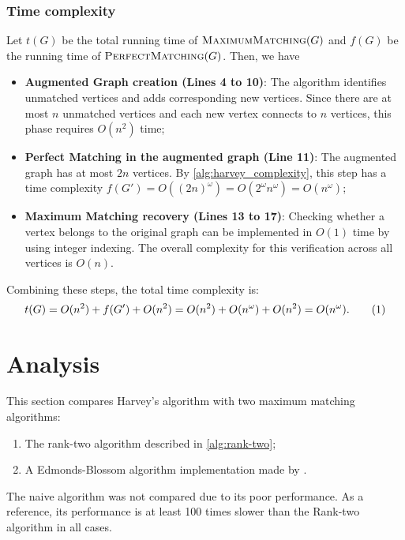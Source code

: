 \subsubsection{Time complexity}
\noindent
Let \(t(G)\) be the total running time of \(\textsc{MaximumMatching}(G)\) and \(f(G)\) be the running time of \(\textsc{PerfectMatching}(G)\). Then, we have
\begin{itemize}
\item \textbf{Augmented Graph creation (Lines 4 to 10)}:
The algorithm identifies unmatched vertices and adds corresponding new vertices. 
Since there are at most \(n\) unmatched vertices and each new vertex connects to \(n\) vertices, this phase requires \(O(n^2)\) time;

\item \textbf{Perfect Matching in the augmented graph (Line 11)}: 
The augmented graph has at most \(2n\) vertices. 
By \cref{alg:harvey_complexity}, this step has a time complexity  \(f(G') = O((2n)^\omega) = O(2^\omega n^\omega) = O(n^\omega)\);

\item \textbf{Maximum Matching recovery (Lines 13 to 17)}: 
Checking whether a vertex belongs to the original graph can be implemented in \(O(1)\) time by using integer indexing. 
The overall complexity for this verification across all vertices is \(O(n)\).
\end{itemize}
Combining these steps, the total time complexity is:
\[
t(G) = O(n^2) + f(G') + O(n^2) = O(n^2) + O(n^\omega) + O(n^2) = O(n^\omega). \numberthis \label{alg:maximum_matching_complexity}
\]

\section{Analysis}
\label{Maximum:analysis}
\noindent
This section compares Harvey's algorithm with two maximum matching algorithms:
\begin{enumerate}
   \item The rank-two algorithm described in \cref{alg:rank-two};
   \item A Edmonds-Blossom algorithm implementation made by \citet{giovana:blossom}.
\end{enumerate}
\noindent
The naive algorithm was not compared due to its poor performance.
As a reference, its performance is at least 100 times slower than the Rank-two algorithm in all cases.

